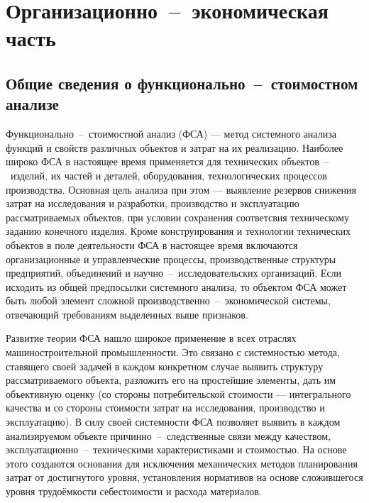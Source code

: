 \newpage
\section{Организационно~--~экономическая часть}

\subsection{Общие сведения о функционально~--~стоимостном анализе}
Функционально~--~стоимостной анализ (ФСА) --- метод системного
анализа функций и свойств различных объектов и затрат на их
реализацию.
Наиболее широко ФСА в настоящее время применяется для технических
объектов~--~изделий, их частей и деталей, оборудования, технологических процессов
производства.
Основная цель анализа при этом --- выявление резервов снижения затрат на
исследования и разработки, производство и эксплуатацию рассматриваемых объектов,
при условии сохранения соответсвия техническому заданию конечного изделия.
Кроме конструирования и технологии технических объектов в поле деятельности ФСА
в настоящее время включаются организационные и управленческие процессы,
производственные структуры предприятий, объединений и научно~--~исследовательских
организаций.
Если исходить из общей предпосылки системного анализа, то объектом ФСА может
быть любой элемент сложной производственно~--~экономической системы, отвечающий
требованиям выделенных выше признаков.


Развитие теории ФСА нашло широкое применение в всех отраслях машиностроительной
промышленности.
Это связано с системностью метода, ставящего своей задачей в каждом конкретном
случае выявить структуру рассматриваемого объекта, разложить его на простейшие
элементы, дать им объективную оценку (со стороны потребительской стоимости ---
интегрального качества и со стороны стоимости затрат на исследования,
производство и эксплуатацию).
В силу своей системности ФСА позволяет выявить в каждом анализируемом объекте
причинно~--~следственные связи между качеством, эксплуатационно~--~техническими
характеристиками и стоимостью.
На основе этого создаются основания для исключения механических методов
планирования затрат от достигнутого уровня, установления нормативов на основе
сложившегося уровня трудоёмкости себестоимости и расхода материалов.


